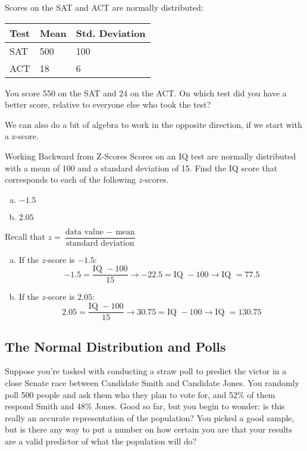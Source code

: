 \begin{try}
Scores on the SAT and ACT are normally distributed:
\begin{center}
\begin{tabular}{l l l}
Test & Mean & Std. Deviation\\
\hline
SAT & 500 & 100\\
ACT & 18 & 6
\end{tabular}
\end{center}
You score 550 on the SAT and 24 on the ACT.  On which test did you have a better score, relative to everyone else who took the test?
\end{try}

We can also do a bit of algebra to work in the opposite direction, if we start with a z-score.

\begin{example}[https://www.youtube.com/watch?v=qfg_DWgY3Hg]{Working Backward from Z-Scores}
Scores on an IQ test are normally distributed with a mean of 100 and a standard deviation of 15.  Find the IQ score that corresponds to each of the following $z$-scores.
\begin{enumerate}[(a)]
\item $-1.5$
\item $2.05$
\end{enumerate}

\sol
Recall that $z=\dfrac{\textrm{data value } - \textrm{ mean}}{\textrm{standard deviation}}$
\begin{enumerate}[(a)]
\item If the $z$-score is $-1.5$:
\[-1.5=\dfrac{\textrm{IQ } - 100}{15} \longrightarrow -22.5 = \textrm{IQ } - 100 \longrightarrow \textrm{IQ } = \boxed{77.5}\]
\item If the $z$-score is $2.05$:
\[2.05=\dfrac{\textrm{IQ } - 100}{15} \longrightarrow 30.75 = \textrm{IQ } - 100 \longrightarrow \textrm{IQ } = \boxed{130.75}\]
\end{enumerate}
\end{example}
\pagebreak

\subsection{The Normal Distribution and Polls}
Suppose you're tasked with conducting a straw poll to predict the victor in a close Senate race between Candidate Smith and Candidate Jones.  You randomly poll 500 people and ask them who they plan to vote for, and 52\% of them respond Smith and 48\% Jones.  Good so far, but you begin to wonder: is this really an accurate representation of the population?  You picked a good sample, but is there any way to put a number on how certain you are that your results are a valid predictor of what the population will do?

